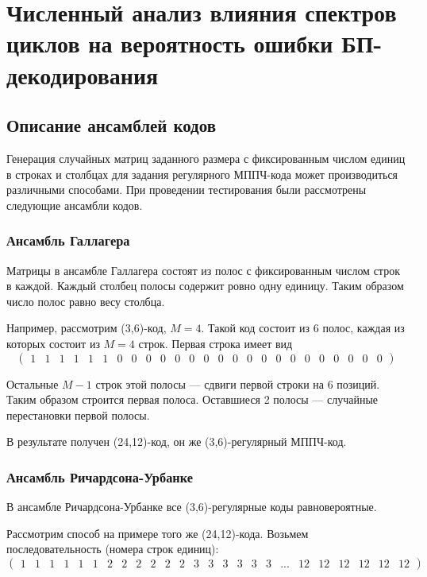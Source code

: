 \chapter{Численный анализ влияния спектров циклов на вероятность ошибки 
БП-декодирования} 

\section{Описание ансамблей кодов}

Генерация случайных матриц заданного размера с фиксированным числом единиц в строках и столбцах для
задания регулярного МППЧ-кода может производиться различными способами. При проведении
тестирования были рассмотрены следующие ансамбли кодов.

\subsection{Ансамбль Галлагера}

Матрицы в ансамбле Галлагера состоят из полос с фиксированным числом строк в каждой. Каждый столбец
полосы содержит ровно одну единицу. Таким образом число полос равно весу столбца.

Например, рассмотрим (3,6)-код, $M=4$. Такой код состоит из 6 полос, каждая из которых состоит
из $M=4$ строк. Первая строка имеет вид
\setcounter{MaxMatrixCols}{30}
\[
\begin{pmatrix}
1 & 1 & 1 & 1 & 1 & 1 & 0 & 0 & 0 & 0 & 0 & 0 & 0 & 0 & 0 & 0 & 0 & 0 & 0 & 0 & 0 & 0 & 0 & 0 & 0
\end{pmatrix}
\]

Остальные $M-1$ строк этой полосы --- сдвиги первой строки на 6 позиций. Таким образом строится первая
полоса. Оставшиеся 2 полосы --- случайные перестановки первой полосы.

В результате получен (24,12)-код, он же (3,6)-регулярный МППЧ-код.

\subsection{Ансамбль Ричардсона-Урбанке}

В ансамбле Ричардсона-Урбанке все (3,6)-регулярные коды равновероятные.

Рассмотрим способ на примере того же (24,12)-кода.
Возьмем последовательность (номера строк единиц):
\[
\begin{pmatrix}
	1 & 1 & 1 & 1 & 1 & 1 & 2 & 2 & 2 & 2 & 2 & 2 & 3 & 3 & 3 & 3 & 3 & 3 & ... & 12 & 12 & 12 & 12 & 12 & 12
\end{pmatrix}
\]

